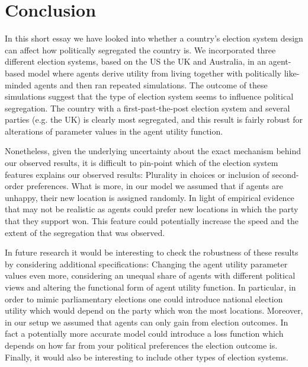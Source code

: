 \documentclass[12pt, a4paper]{article}
\begin{document}
	\section{\label{sec_conc}Conclusion}
	In this short essay we have looked into whether a country's election system design can affect how politically segregated the country is. We incorporated three different election systems, based on the US the UK and Australia, in an agent-based model where agents derive utility from living together with politically like-minded agents and then ran repeated simulations. The outcome of these simulations suggest that the type of election system seems to influence political segregation. The country with a first-past-the-post election system and several parties (e.g. the UK) is clearly most segregated, and this result is fairly robust for alterations of parameter values in the agent utility function. 
	
	Nonetheless, given the underlying uncertainty about the exact mechanism behind our observed results, it is difficult to pin-point which of the election system features explains our observed results: Plurality in choices or inclusion of second-order preferences. What is more, in our model we assumed that if agents are unhappy, their new location is assigned randomly. In light of empirical evidence that may not be realistic as agents could prefer new locations in which the party that they support won. This feature could potentially increase the speed and the extent of the segregation that was observed. 
	
	In future research it would be interesting to check the robustness of these results by considering additional specifications: Changing the agent utility parameter values even more, considering an unequal share of agents with different political views and altering the functional form of agent utility function. In particular, in order to mimic parliamentary elections one could introduce national election utility which would depend on the party which won the most locations. Moreover, in our setup we assumed that agents can only gain from election outcomes. In fact a potentially more accurate model could introduce a loss function which depends on how far from your political preferences the election outcome is. Finally, it would also be interesting to include other types of election systems. 
	
	
	
\end{document}
